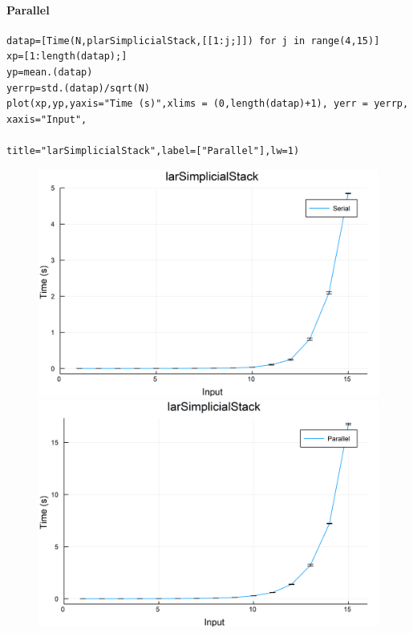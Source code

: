 \documentclass{article}
\begin{document}
\paragraph{Parallel}
\begin{flushleft}\small
\begin{list}{}{} \item
    \begin{Verbatim}[tabsize=4]
datap=[Time(N,plarSimplicialStack,[[1:j;]]) for j in range(4,15)]
xp=[1:length(datap);]
yp=mean.(datap)
yerrp=std.(datap)/sqrt(N)
plot(xp,yp,yaxis="Time (s)",xlims = (0,length(datap)+1), yerr = yerrp, xaxis="Input",
                                        title="larSimplicialStack",label=["Parallel"],lw=1)
    \end{Verbatim}
\end{list}
\end{flushleft}
\begin{figure}[h!]
\centering
\includegraphics[scale=0.06]{larSimplicialStackSer.png}
\includegraphics[scale=0.06]{larSimplicialStackPar.png}
\end{figure}
\end{document}
